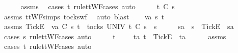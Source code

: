\ \ \ \ \isamarkupfalse%
\ assms{\isacharparenleft}{}{\isacharparenright}\ \isamarkupfalse%
\ {\isacharparenleft}cases\ t\ rule{\isacharcolon}ttWF{\isachardot}cases{\isacharcomma}\ auto{\isacharparenright}\isanewline
\ \ \isamarkupfalse%
\ \isamarkupfalse%
\ {\isachardoublequoteopen}t\ {\isasymle}\isactrlsub C\ s{}{\isacharprime}{\isachardoublequoteclose}\isanewline
\ \ \ \ \isamarkupfalse%
\ assms{\isacharparenleft}{}{\isacharparenright}\ ttWF{\isachardot}simps{\isacharparenleft}{}{\isacharparenright}\ tocks{\isacharunderscore}wf\ \isamarkupfalse%
\ {\isacharparenleft}auto{\isacharcomma}\ blast{\isacharparenright}\isanewline
{}\isamarkupfalse%
\isanewline
\ \ \isamarkupfalse%
\ va\ s{}{\isacharprime}\ t\isanewline
\ \ \isamarkupfalse%
\ assms{\isacharcolon}\ {\isachardoublequoteopen}{\isacharbrackleft}Tick{\isacharbrackright}\isactrlsub E\ {\isacharhash}\ va\ {\isasymsubseteq}\isactrlsub C\ s{}{\isacharprime}{\isachardoublequoteclose}\ {\isachardoublequoteopen}t\ {\isasymin}\ tocks\ UNIV{\isachardoublequoteclose}\ {\isachardoublequoteopen}t\ {\isasymle}\isactrlsub C\ s{}{\isacharprime}\ {\isacharat}\ s{}{\isachardoublequoteclose}\isanewline
\ \ \isamarkupfalse%
\ \isamarkupfalse%
\ s{}{\isacharprime}a\ \ {\isachardoublequoteopen}s{}{\isacharprime}\ {\isacharequal}\ {\isacharbrackleft}Tick{\isacharbrackright}\isactrlsub E\ {\isacharhash}\ s{}{\isacharprime}a{\isachardoublequoteclose}\isanewline
\ \ \ \ \isamarkupfalse%
\ {\isacharparenleft}cases\ s{}{\isacharprime}\ rule{\isacharcolon}ttWF{\isachardot}cases{\isacharcomma}\ auto{\isacharparenright}\isanewline
\ \ \isamarkupfalse%
\ \isamarkupfalse%
\ {\isachardoublequoteopen}t\ {\isacharequal}\ {\isacharbrackleft}{\isacharbrackright}\ {\isasymor}\ {\isacharparenleft}{\isasymexists}\ ta{\isachardot}\ t\ {\isacharequal}\ {\isacharbrackleft}Tick{\isacharbrackright}\isactrlsub E\ {\isacharhash}\ ta{\isacharparenright}{\isachardoublequoteclose}\isanewline
\ \ \ \ \isamarkupfalse%
\ assms{\isacharparenleft}{}{\isacharparenright}\ \isamarkupfalse%
\ {\isacharparenleft}cases\ t\ rule{\isacharcolon}ttWF{\isachardot}cases{\isacharcomma}\ auto{\isacharparenright}\isanewline
\ \ \isamarkupfalse%
